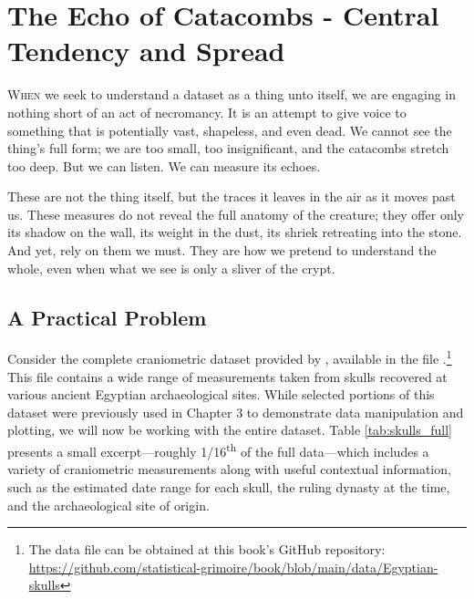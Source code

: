 \chapter{The Echo of Catacombs - Central Tendency and Spread}

\IMFellEnglish
\lettrine[lines=5, realheight]{W}{hen} we seek to understand a dataset as a thing unto itself, we are engaging in nothing short of an act of necromancy. It is an attempt to give voice to something that is potentially vast, shapeless, and even dead. We cannot see the thing's full form; we are too small, too insignificant, and the catacombs stretch too deep. But we can listen. We can measure its echoes. 

These are not the thing itself, but the traces it leaves in the air as it moves past us. These measures do not reveal the full anatomy of the creature; they offer only its shadow on the wall, its weight in the dust, its shriek retreating into the stone. And yet, rely on them we must. They are how we pretend to understand the whole, even when what we see is only a sliver of the crypt.

\normalfont

\section{A Practical Problem}

Consider the complete craniometric dataset provided by  \textcite{Thomson1905}, available in the file .\footnote{The data file can be obtained at this book's GitHub repository: \url{https://github.com/statistical-grimoire/book/blob/main/data/Egyptian-skulls}} This file contains a wide range of measurements taken from skulls recovered at various ancient Egyptian archaeological sites. While selected portions of this dataset were previously used in Chapter 3 to demonstrate data manipulation and plotting, we will now be working with the entire dataset. Table \ref{tab:skulls_full} presents a small excerpt—roughly 1/16\textsuperscript{th} of the full data—which includes a variety of craniometric measurements along with useful contextual information, such as the estimated date range for each skull, the ruling dynasty at the time, and the archaeological site of origin.


